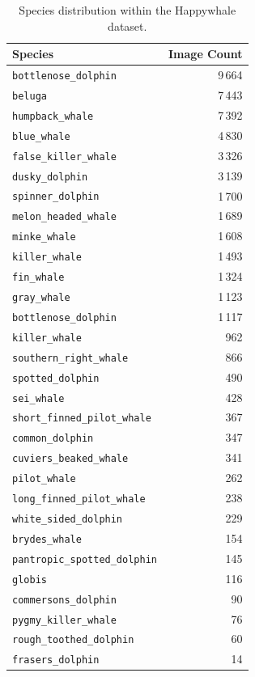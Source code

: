 \documentclass[twocolumn]{article}
\begin{document}
\begin{table}[ht]
\centering
\begin{tabular}{l r}
\hline
\textbf{Species} & \textbf{Image Count} \\
\hline
\texttt{bottlenose\_dolphin}           & 9\,664 \\
\texttt{beluga}                        & 7\,443 \\
\texttt{humpback\_whale}               & 7\,392 \\
\texttt{blue\_whale}                   & 4\,830 \\
\texttt{false\_killer\_whale}          & 3\,326 \\
\texttt{dusky\_dolphin}                & 3\,139 \\
\texttt{spinner\_dolphin}              & 1\,700 \\
\texttt{melon\_headed\_whale}          & 1\,689 \\
\texttt{minke\_whale}                  & 1\,608 \\
\texttt{killer\_whale}                 & 1\,493 \\
\texttt{fin\_whale}                    & 1\,324 \\
\texttt{gray\_whale}                   & 1\,123 \\
\texttt{bottlenose\_dolphin}            & 1\,117 \\
\texttt{killer\_whale}                  &   962 \\
\texttt{southern\_right\_whale}        &   866 \\
\texttt{spotted\_dolphin}              &   490 \\
\texttt{sei\_whale}                    &   428 \\
\texttt{short\_finned\_pilot\_whale}   &   367 \\
\texttt{common\_dolphin}               &   347 \\
\texttt{cuviers\_beaked\_whale}        &   341 \\
\texttt{pilot\_whale}                  &   262 \\
\texttt{long\_finned\_pilot\_whale}    &   238 \\
\texttt{white\_sided\_dolphin}         &   229 \\
\texttt{brydes\_whale}                 &   154 \\
\texttt{pantropic\_spotted\_dolphin}   &   145 \\
\texttt{globis}                        &   116 \\
\texttt{commersons\_dolphin}           &    90 \\
\texttt{pygmy\_killer\_whale}          &    76 \\
\texttt{rough\_toothed\_dolphin}       &    60 \\
\texttt{frasers\_dolphin}&    14 \\
\hline
\end{tabular}
\caption{Species distribution within the Happywhale dataset.}
\label{tab:species_counts}
\end{table}
\end{document}

